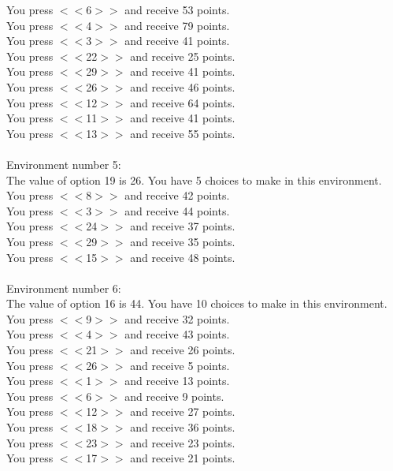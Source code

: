 \documentclass[pdflatex,sn-nature]{sn-jnl}%
\theoremstyle{thmstyleone}%
\theoremstyle{thmstyletwo}%
\theoremstyle{thmstylethree}%
\begin{document}
You press $<<$6$>>$ and receive 53 points. $~$\\ 
You press $<<$4$>>$ and receive 79 points. $~$\\ 
You press $<<$3$>>$ and receive 41 points. $~$\\ 
You press $<<$22$>>$ and receive 25 points. $~$\\ 
You press $<<$29$>>$ and receive 41 points. $~$\\ 
You press $<<$26$>>$ and receive 46 points. $~$\\ 
You press $<<$12$>>$ and receive 64 points. $~$\\ 
You press $<<$11$>>$ and receive 41 points. $~$\\ 
You press $<<$13$>>$ and receive 55 points. $~$\\ 
 $~$\\ 
Environment number 5: $~$\\ 
The value of option 19 is 26. You have 5 choices to make in this environment. $~$\\ 
You press $<<$8$>>$ and receive 42 points. $~$\\ 
You press $<<$3$>>$ and receive 44 points. $~$\\ 
You press $<<$24$>>$ and receive 37 points. $~$\\ 
You press $<<$29$>>$ and receive 35 points. $~$\\ 
You press $<<$15$>>$ and receive 48 points. $~$\\ 
 $~$\\ 
Environment number 6: $~$\\ 
The value of option 16 is 44. You have 10 choices to make in this environment. $~$\\ 
You press $<<$9$>>$ and receive 32 points. $~$\\ 
You press $<<$4$>>$ and receive 43 points. $~$\\ 
You press $<<$21$>>$ and receive 26 points. $~$\\ 
You press $<<$26$>>$ and receive 5 points. $~$\\ 
You press $<<$1$>>$ and receive 13 points. $~$\\ 
You press $<<$6$>>$ and receive 9 points. $~$\\ 
You press $<<$12$>>$ and receive 27 points. $~$\\ 
You press $<<$18$>>$ and receive 36 points. $~$\\ 
You press $<<$23$>>$ and receive 23 points. $~$\\ 
You press $<<$17$>>$ and receive 21 points. $~$\\ 
\end{document}
